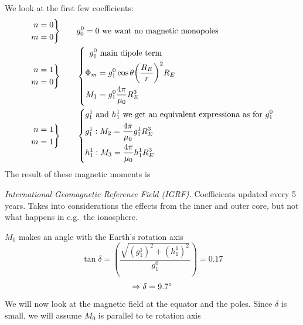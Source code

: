 We look at the first few coefficients:
\begin{align*}
    \left.\begin{aligned}
        n=0\\m=0
    \end{aligned}\right \}&\qquad g_0^0=0~\textnormal{we want no magnetic monopoles}\\
    \left.\begin{aligned}
        n=1\\m=0
    \end{aligned}\right \}&\qquad
    \left \{\begin{aligned}
        g_1^0&~\textnormal{main dipole term}\\
        \Phi_m&=g_1^0\cos\theta{\left(\frac{R_E}{r}\right)}^2R_E\\
        M_1&=g_1^0\frac{4\pi}{\mu_0}R_E^3
    \end{aligned}\right.\\
    \left.\begin{aligned}
        n=1\\m=1
    \end{aligned}\right \}&\qquad
    \left \{\begin{aligned}
        &g_1^1\textnormal{ and }h_1^1~\textnormal{we get an equivalent expressiona as for }g_1^0\\
        &g_1^1: M_2=\frac{4\pi}{\mu_0}g_1^1R_E^3\\
        &h_1^1: M_3=\frac{4\pi}{\mu_0}h_1^1R_E^3
    \end{aligned}\right.
\end{align*}
The result of these magnetic moments is
\begin{txboxed}\emph{International Geomagnetic Reference Field (IGRF).} Coefficients updated every 5 years. Takes into considerations the effects from the inner and outer core, but not what happens in e.g.\ the ionosphere.
\end{txboxed}
\(M_0\) makes an angle with the Earth's rotation axis
\begin{equation*}
    \tan\delta=\left(\frac{\sqrt{{\left(g_1^1\right)}^2+{\left(h_1^1\right)}^2}}{g_1^0}\right)=0.17
\end{equation*}
\begin{equation*}
    \Rightarrow \delta=9.7^\circ
\end{equation*}
We will now look at the magnetic field at the equator and the poles. Since \(\delta \) is small, we will assume \(M_0\) is parallel to te rotation axis
